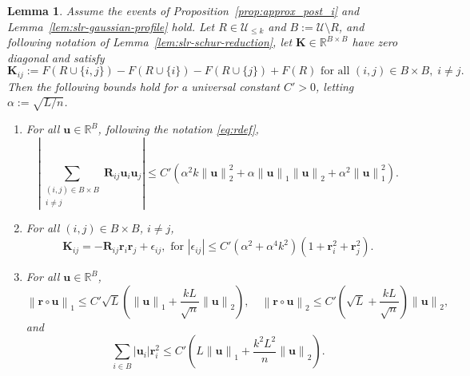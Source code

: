 \documentclass[11pt]{article}
\newtheorem{lemma}{Lemma}
\newcommand{\defeq}{:=}
\newcommand{\norm}[1]{\left\lVert#1\right\rVert}
\newcommand{\eps}{\epsilon}
\newcommand{\R}{\mathbb{R}}
\newcommand{\1}{\mathbf{1}}
\newcommand{\0}{\mathbf{0}}
\newcommand{\Par}[1]{\left(#1\right)}
\newcommand{\Abs}[1]{\left|#1\right|}
\newcommand{\mk}{{\mathbf{K}}}
\newcommand{\mr}{{\mathbf{R}}}
\newcommand{\vr}{{\mathbf{r}}}
\newcommand{\vu}{{\mathbf{u}}}
\newcommand{\calU}{{\mathcal{U}}}
\begin{document}
\begin{lemma}\label{lem:combine_params}
Assume the events of Proposition~\ref{prop:approx_post_i} and Lemma~\ref{lem:slr-gaussian-profile} hold. Let $R \in \calU_{\le k}$ and $B \defeq \calU \setminus R$, 
and following notation of Lemma~\ref{lem:slr-schur-reduction}, let $\mk \in \R^{B \times B}$ have zero diagonal and satisfy
\[\mk_{ij} \defeq F\Par{R \cup \{i, j\}} - F\Par{R \cup \{i\}} - F\Par{R \cup \{j\}} + F(R) \text{ for all } (i, j) \in B \times B,\; i\neq j.\]
Then the following bounds hold for a universal constant $C' > 0$, letting $\alpha \defeq \sqrt{L/n}$.
\begin{enumerate}
\item\label{item:quadform_bound} For all $\vu \in \R^B$, following the notation \eqref{eq:rdef},
\[\Abs{\sum_{\substack{(i, j) \in B \times B \\ i \neq j}} \mr_{ij}\vu_i\vu_j} \le C'\Par{\alpha^2 k \norm{\vu}_2^2 + \alpha\norm{\vu}_1\norm{\vu}_2 + \alpha^2\norm{\vu}_1^2 }.\]
\item For all $(i, j) \in B \times B$, $i \neq j$,
\[\mk_{ij} = -\mr_{ij}\vr_i\vr_j + \eps_{ij}, \text{ for } \Abs{\eps_{ij}} \le C'\Par{\alpha^2 + \alpha^4k^2}\Par{1 + \vr_i^2 + \vr_j^2}.\]\label{item:entry_perturb_bound}
\item For all $\vu \in \R^B$,
\[\norm{\vr \circ \vu}_1 \le C'\sqrt{L}\Par{\norm{\vu}_1 + \frac{kL}{\sqrt n}\norm{\vu}_2},\quad \norm{\vr \circ \vu}_2 \le C'\Par{\sqrt{L} + \frac{kL}{\sqrt n}}\norm{\vu}_2,\]
and
\[\sum_{i \in B} |\vu_i| \vr_i^2 \le C'\Par{L\norm{\vu}_1 + \frac{k^2L^2}{n}\norm{\vu}_2}.\]\label{item:reweight_u}
\end{enumerate}
\end{lemma}
\end{document}
